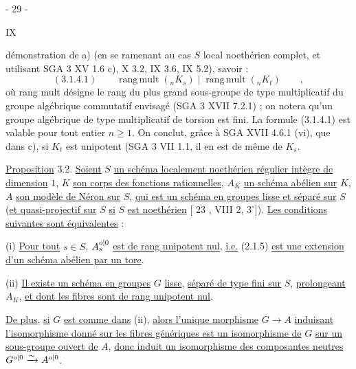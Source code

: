 \begin{center}- 29 -\end{center}\hfill IX

démonstration de a) (en se ramenant au cas $S$ local noethérien complet,
et utilisant SGA 3 XV 1.6 c), X 3.2, IX 3.6, IX 5.2), savoir :
\[
 (3.1.4.1)\qquad\operatorname{rang\,mult}({}_nK_s)\mid
 \operatorname{rang\,mult}({}_nK_t)\qquad,
\]
où rang mult désigne le rang du plus grand sous-groupe de type multiplicatif du groupe algébrique commutatif envisagé (SGA 3 XVII 7.2.1) ;
on notera qu'un groupe algébrique de type multiplicatif de torsion est
fini. La formule (3.1.4.1) est valable pour tout entier $n\geq1$. On
conclut, grâce à SGA XVII 4.6.1 (vi), que dans c), si $K_t$ est unipotent
(SGA 3 VII 1.1, il en est de même de $K_s$.

\uline{Proposition} 3.2. \uline{Soient} $S$ \uline{un schéma localement noethérien régulier
intègre de dimension} $1$, $K$ \uline{son corps des fonctions rationnelles}, $A_K$
\uline{un schéma abélien sur} $K$, $A$ \uline{son modèle de Néron sur} $S$, \uline{qui est un
schéma en groupes lisse et séparé sur} $S$ (\uline{et quasi-projectif sur} $S$
\uline{si} $S$ \uline{est noethérien} [ 23 , VIII 2, $3^\circ$]). \uline{Les conditions suivantes
sont équivalentes} :

(i) \uline{Pour tout} $s\in S$, $A_s^{{o|0}}$ \uline{est de rang unipotent nul}, \uline{i.e.}
(2.1.5) \uline{est une extension d'un schéma abélien par un tore}.

(ii) \uline{Il existe un schéma en groupes} $G$ \uline{lisse}, \uline{séparé de type
fini sur} $S$, \uline{prolongeant} $A_K$, \uline{et dont les fibres sont de rang unipotent nul}.

\uline{De plus}, \uline{si} $G$ \uline{est comme dans} (ii), \uline{alors l'unique morphisme}
$G\longrightarrow A$ \uline{induisant l'isomorphisme donné sur les fibres génériques est
un isomorphisme de} $G$ \uline{sur un sous-groupe ouvert de} $A$, \uline{donc induit un
isomorphisme des composantes neutres}
$G^{{o|0}}\xrightarrow{\sim}A^{{o|0}}$.
